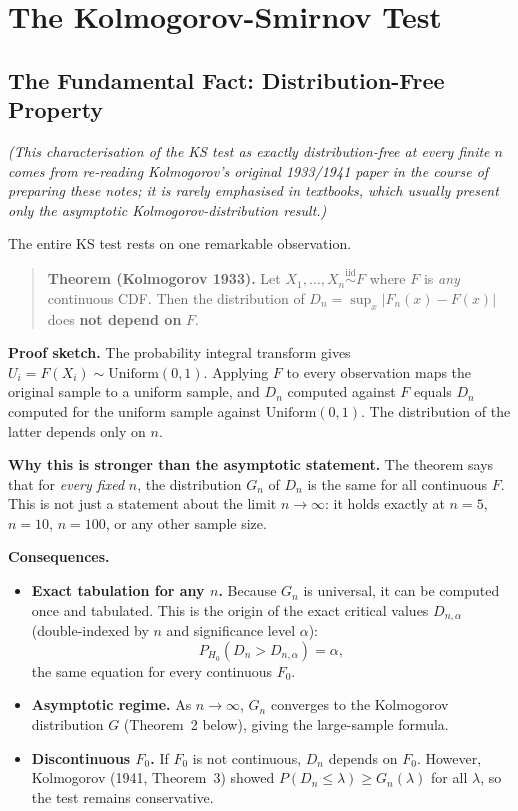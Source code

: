 \documentclass[11pt, a4paper]{article}
\begin{document}
\section{The Kolmogorov-Smirnov Test}

\subsection{The Fundamental Fact: Distribution-Free Property}

\textit{(This characterisation of the KS test as exactly distribution-free at every
finite $n$ comes from re-reading Kolmogorov's original 1933/1941 paper in the course
of preparing these notes; it is rarely emphasised in textbooks, which usually present
only the asymptotic Kolmogorov-distribution result.)}

\medskip
The entire KS test rests on one remarkable observation.

\begin{quote}
\textbf{Theorem (Kolmogorov 1933).}
Let $X_1,\ldots,X_n\overset{\text{iid}}{\sim}F$ where $F$ is \emph{any} continuous CDF.
Then the distribution of
$D_n = \sup_x |F_n(x) - F(x)|$
does \textbf{not depend on} $F$.
\end{quote}

\textbf{Proof sketch.}
The probability integral transform gives $U_i = F(X_i) \sim \mathrm{Uniform}(0,1)$.
Applying $F$ to every observation maps the original sample to a uniform sample, and
$D_n$ computed against $F$ equals $D_n$ computed for the uniform sample against
$\mathrm{Uniform}(0,1)$.
The distribution of the latter depends only on $n$.

\textbf{Why this is stronger than the asymptotic statement.}
The theorem says that for \emph{every fixed} $n$, the distribution $G_n$ of $D_n$ is
the same for all continuous $F$.
This is not just a statement about the limit $n\to\infty$: it holds exactly at $n=5$,
$n=10$, $n=100$, or any other sample size.

\textbf{Consequences.}
\begin{itemize}
  \item \textbf{Exact tabulation for any $n$.}
        Because $G_n$ is universal, it can be computed once and tabulated.
        This is the origin of the exact critical values $D_{n,\alpha}$
        (double-indexed by $n$ and significance level $\alpha$):
        \[
          P_{H_0}(D_n > D_{n,\alpha}) = \alpha,
        \]
        the same equation for every continuous $F_0$.
  \item \textbf{Asymptotic regime.}
        As $n\to\infty$, $G_n$ converges to the Kolmogorov distribution $G$
        (Theorem~2 below), giving the large-sample formula.
  \item \textbf{Discontinuous $F_0$.}
        If $F_0$ is not continuous, $D_n$ depends on $F_0$.
        However, Kolmogorov (1941, Theorem~3) showed
        $P(D_n \leq \lambda) \geq G_n(\lambda)$ for all $\lambda$,
        so the test remains conservative.
\end{itemize}
\end{document}
